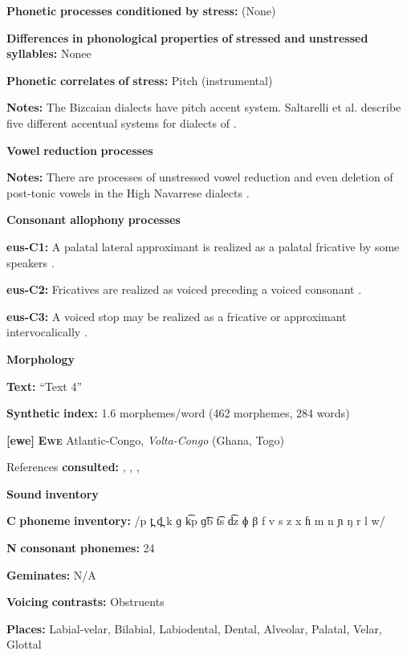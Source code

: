 \textbf{Phonetic} \textbf{processes} \textbf{conditioned} \textbf{by} \textbf{stress:} (None)

\textbf{Differences} \textbf{in} \textbf{phonological} \textbf{properties} \textbf{of} \textbf{stressed} \textbf{and} \textbf{unstressed} \textbf{syllables:} Nonee

\textbf{Phonetic} \textbf{correlates} \textbf{of} \textbf{stress:} Pitch (instrumental)

\textbf{Notes:} The Bizcaian dialects have pitch accent system. Saltarelli et al. describe five different accentual systems for dialects of \citet[282-3]{Basque1988}.

\textbf{Vowel} \textbf{reduction} \textbf{processes}

\textbf{Notes:} There are processes of unstressed vowel reduction and even deletion of post-tonic vowels in the High Navarrese dialects \citep[56-7]{Hualde2003}.

\textbf{Consonant} \textbf{allophony} \textbf{processes}

\textbf{eus-C1:} A palatal lateral approximant is realized as a palatal fricative by some speakers \citep[29]{Hualde2003}.

\textbf{eus-C2:} Fricatives are realized as voiced preceding a voiced consonant \citep[24]{Hualde2003}.

\textbf{eus-C3:} A voiced stop may be realized as a fricative or approximant intervocalically \citep[19]{Hualde2003}.

\textbf{Morphology}

\textbf{Text:} “Text 4” \citep[906-912]{Hualde2003}

\textbf{Synthetic} \textbf{index:} 1.6 morphemes/word (462 morphemes, 284 words)

\textbf{[ewe]}   \textbf{\textsc{Ewe}}  Atlantic-Congo, \textit{Volta-Congo} (Ghana, Togo)

References \textbf{consulted:} \citet{Ameka1991}, \citet{Duthie1996}, \citet{Jalloh2005}, \citet{Stahlke1971}

\textbf{Sound} \textbf{inventory}

\textbf{C} \textbf{phoneme} \textbf{inventory:} /p t̪ d̪ k ɡ k͡p ɡ͡b t͡s d͡z ɸ β f v s z x ɦ m n ɲ ŋ r l w/

\textbf{N} \textbf{consonant} \textbf{phonemes:} 24

\textbf{Geminates:} N/A

\textbf{Voicing} \textbf{contrasts:} Obstruents

\textbf{Places:} Labial-velar, Bilabial, Labiodental, Dental, Alveolar, Palatal, Velar, Glottal

